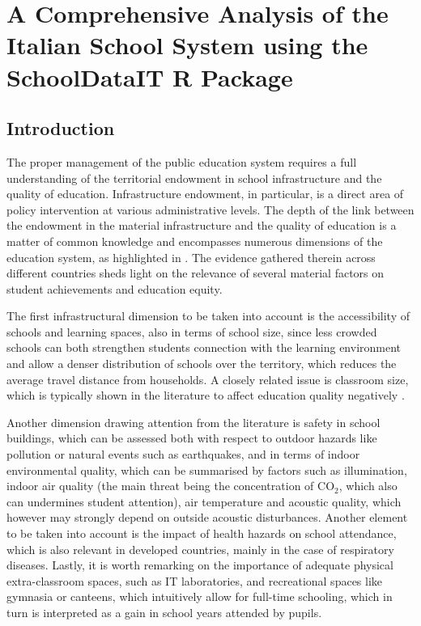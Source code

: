 \documentclass[openany, 11pt, oneside]{book}
\begin{document}
%
%
%
\chapter[School Infrastructure Data]{A Comprehensive Analysis of the Italian School System using the SchoolDataIT R Package} \label{chapter:SchoolDataIT}
\section{Introduction} \label{section:SchoolDataIT:intro}

The proper management of the public education system requires a full understanding of the territorial endowment in school infrastructure and the quality of education. Infrastructure endowment, in particular, is a direct area of policy intervention at various administrative levels. The depth of the link between the endowment in the material infrastructure and the quality of education is a matter of common knowledge and encompasses numerous dimensions of the education system, as highlighted in \cite{WB}. The evidence gathered therein across different countries sheds light on the relevance of several material factors on student achievements and education equity.

The first infrastructural dimension to be taken into account is the accessibility of schools and learning spaces, also in terms of school size, since less crowded schools can both strengthen students connection with the learning environment and allow a denser distribution of schools over the territory, which reduces the average travel distance from households. A closely related issue is classroom size, which is typically shown in the literature to affect education quality negatively \parencite{WB}.

Another dimension drawing attention from the literature is safety in school buildings, which can be assessed both with respect to outdoor hazards like pollution or natural events such as earthquakes, and in terms of indoor environmental quality, which can be summarised by factors such as illumination, indoor air quality (the main threat being the concentration of $\mathrm{CO_{2}}$, which also can undermines student attention), air temperature and acoustic quality, which however may strongly depend on outside acoustic disturbances. Another element to be taken into account is the impact of health hazards on school attendance, which is also relevant in developed countries, mainly in the case of respiratory diseases. Lastly, it is worth remarking on the importance of adequate physical extra-classroom spaces, such as IT laboratories, and recreational spaces like gymnasia or canteens, which intuitively allow for full-time schooling, which in turn is interpreted as a gain in school years attended by pupils.
\end{document}

